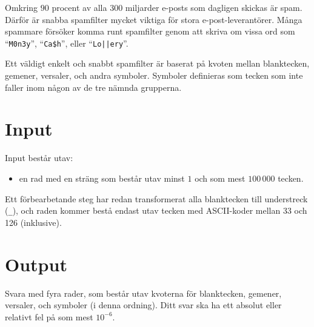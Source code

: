 
%
\noindent
Omkring $90$ procent av alla 300 miljarder e-posts som dagligen skickas är spam. Därför 
är snabba spamfilter mycket viktiga för stora e-post-leverantörer. Många spammare
försöker komma runt spamfilter genom att skriva om vissa ord som
``{\tt M0n3y}'', ``{\tt Ca\$h}'', eller ``{\tt Lo||ery}''.

Ett väldigt enkelt och snabbt spamfilter är baserat på kvoten mellan blanktecken,
gemener, versaler, och andra symboler. Symboler definieras som tecken som inte 
faller inom någon av de tre nämnda grupperna.

\section*{Input}

Input består utav:
\begin{itemize}
	\item en rad med en sträng som består utav minst $1$ och som mest $100\,000$ tecken.
\end{itemize}
Ett förbearbetande steg har redan transformerat alla blanktecken till understreck ({\tt\_}),
och raden kommer bestå endast utav tecken med ASCII-koder mellan 33 och 126 (inklusive).

\section*{Output}

Svara med fyra rader, som består utav kvoterna för blanktecken, gemener, versaler, och
symboler (i denna ordning). Ditt svar ska ha ett absolut eller relativt fel på som mest 
$10^{-6}$.
